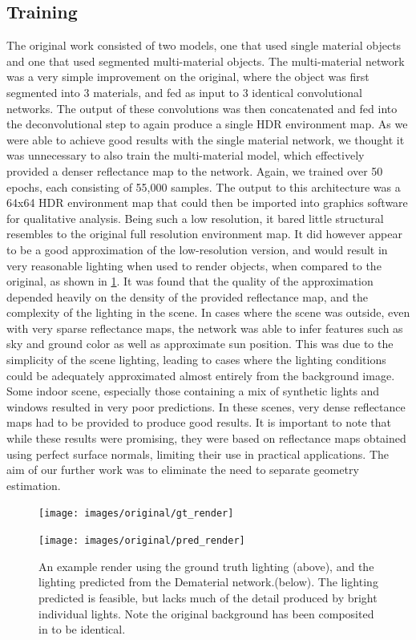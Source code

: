 \documentclass[ %
                    author={Gavin Parker},
                supervisor={Dr. Neill Campbell},
                    degree={MEng},
                     title={Deep Siamese Networks for Illumination Estimation from Stereo Images},
                  subtitle={},
                      type={Research},
                      year={2018} ]{dissertation}
\begin{document}
\subsection{Training}
The original work consisted of two models, one that used single material objects and one that used segmented multi-material objects. The multi-material network was a very simple improvement on the original, where the object was first segmented into 3 materials, and fed as input to 3 identical convolutional networks. The output of these convolutions was then concatenated and fed into the deconvolutional step to again produce a single HDR environment map. As we were able to achieve good results with the single material network, we thought it was unnecessary to also train the multi-material model, which effectively provided a denser reflectance map to the network. Again, we trained over 50 epochs, each consisting of 55,000 samples. The output to this architecture was a 64x64 HDR environment map that could then be imported into graphics software for qualitative analysis. Being such a low resolution, it bared little structural resembles to the original full resolution environment map. It did however appear to be a good approximation of the low-resolution version, and would result in very reasonable lighting when used to render objects, when compared to the original, as shown in \ref{fig:demat_eg1}.
\newline
It was found that the quality of the approximation depended heavily on the density of the provided reflectance map, and the complexity of the lighting in the scene. In cases where the scene was outside, even with very sparse reflectance maps, the network was able to infer features such as sky and ground color as well as approximate sun position. This was due to the simplicity of the scene lighting, leading to cases where the lighting conditions could be adequately approximated almost entirely from the background image. Some indoor scene, especially those containing a mix of synthetic lights and windows resulted in very poor predictions. In these scenes, very dense reflectance maps had to be provided to produce good results.
\newline
It is important to note that while these results were promising, they were based on reflectance maps obtained using perfect surface normals, limiting their use in practical applications. The aim of our further work was to eliminate the need to separate geometry estimation.
\begin{figure}[H]
\centering
\texttt{[image: images/original/gt\_render]}
\vspace{0.5cm}

\centering
\texttt{[image: images/original/pred\_render]}
\caption{An example render using the ground truth lighting (above), and the lighting predicted from the Dematerial network.(below). The lighting predicted is feasible, but lacks much of the detail produced by bright individual lights. Note the original background has been composited in to be identical.}
\label{fig:demat_eg1}
\end{figure}
\end{document}
